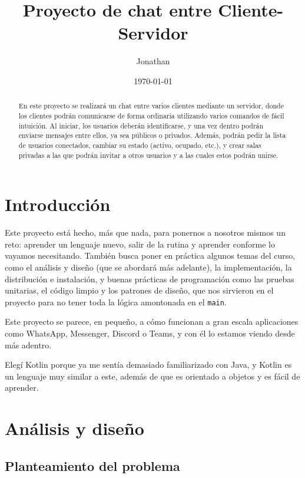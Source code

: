 \documentclass[12pt,letterpaper]{article}
\title{Proyecto de chat entre Cliente-Servidor}
\author{Jonathan}
\date{\today}
\begin{document}
\maketitle

\begin{abstract}
En este proyecto se realizará un chat entre varios clientes mediante un
servidor, donde los clientes podrán comunicarse de forma ordinaria
utilizando varios comandos de fácil intuición. Al iniciar, los usuarios
deberán identificarse, y una vez dentro podrán enviarse mensajes entre
ellos, ya sea públicos o privados. Además, podrán pedir la lista de
usuarios conectados, cambiar su estado (activo, ocupado, etc.), y crear
salas privadas a las que podrán invitar a otros usuarios y a las cuales
estos podrán unirse.
\end{abstract}

\tableofcontents

\section{Introducción}

Este proyecto está hecho, más que nada, para ponernos a nosotros mismos
un reto: aprender un lenguaje nuevo, salir de la rutina y aprender
conforme lo vayamos necesitando. También busca poner en práctica algunos
temas del curso, como el análisis y diseño (que se abordará más
adelante), la implementación, la distribución e instalación, y buenas
prácticas de programación como las pruebas unitarias, el código limpio y
los patrones de diseño, que nos sirvieron en el proyecto para no tener
toda la lógica amontonada en el \texttt{main}.

Este proyecto se parece, en pequeño, a cómo funcionan a gran escala
aplicaciones como WhatsApp, Messenger, Discord o Teams, y con él lo
estamos viendo desde más adentro.

Elegí Kotlin porque ya me sentía demasiado familiarizado con Java, y
Kotlin es un lenguaje muy similar a este, además de que es orientado a
objetos y es fácil de aprender.

\section{Análisis y diseño}

\subsection{Planteamiento del problema}
\end{document}
